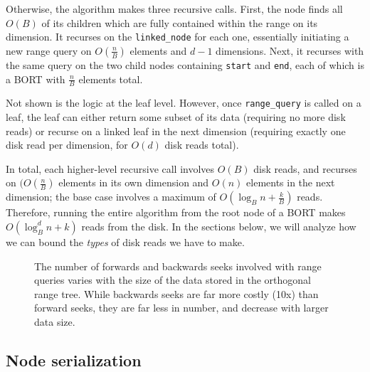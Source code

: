 \documentclass[11pt, oneside]{article}
\newcommand{\ms}{\texttt}
\begin{document}
Otherwise, the algorithm makes three recursive calls. First, the node finds all
$O(B)$ of its children which are fully contained within the range on its
dimension. It recurses on the \ms{linked\_node} for each one, essentially
initiating a new range query on $O(\frac{n}{B})$ elements and $d - 1$
dimensions. Next, it recurses with the same query on the two child nodes
containing \ms{start} and \ms{end}, each of which is a BORT with $\frac{n}{B}$
elements total.

Not shown is the logic at the leaf level. However, once \ms{range\_query} is
called on a leaf, the leaf can either return some subset of its data (requiring
no more disk reads) or recurse on a linked leaf in the next dimension (requiring
exactly one disk read per dimension, for $O(d)$ disk reads total).

In total, each higher-level recursive call involves $O(B)$ disk reads, and
recurses on $(O(\frac{n}{B})$ elements in its own dimension and $O(n)$ elements
in the next dimension; the base case involves a maximum of $O(\log_B n +
\frac{k}{B})$ reads. Therefore, running the entire algorithm from the root node
of a BORT makes $O(\log_B^d n + k)$ reads from the disk. In the sections below,
we will analyze how we can bound the \textit{types} of disk reads we have to
make.

\begin{figure}[b!]
\centering
{}%
\caption{The number of forwards and backwards seeks involved with range queries varies with the size of the data stored in the orthogonal range tree. While backwards seeks are far more costly (10x) than forward seeks, they are far less in number, and decrease with larger data size.}
\label{fig:figure2}
\end{figure}

\subsection{Node serialization}
\end{document}
